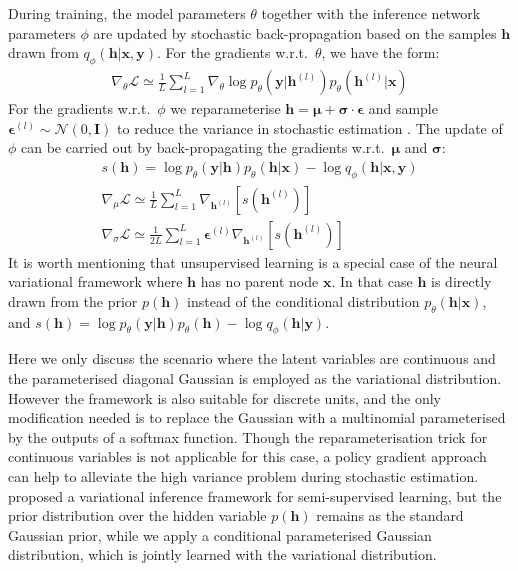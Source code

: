 \documentclass{article}
\newcommand{\tmmathbf}[1]{\ensuremath{\boldsymbol{#1}}}
\begin{document}
During training, the model parameters $\theta$ together with the inference network parameters $\phi$ are updated by stochastic back-propagation based on the samples $\tmmathbf{h}$ drawn from $q_{\phi} ( \tmmathbf{h} | \tmmathbf{\tmmathbf{x}}, \tmmathbf{y})$. 
For the gradients w.r.t.\ $\theta$, we have the form:
\begin{eqnarray}
  & \nabla_{\theta}  \mathcal{L} \simeq \frac{1}{L}  \sum_{l = 1}^L
  \nabla_{\theta} \log p_{\theta} ( \tmmathbf{y} | \tmmathbf{h}^{(l)})
  p_{\theta} ( \tmmathbf{h}^{(l)} | \tmmathbf{\tmmathbf{x}}) & 
\end{eqnarray}
For the gradients w.r.t.\ $\phi$ we reparameterise $\tmmathbf{h} =\tmmathbf{\mu} + \tmmathbf{\sigma} \cdot \tmmathbf{\epsilon}$ and sample $\tmmathbf{\epsilon}^{(l)} \sim \mathcal{N} (0, \tmmathbf{I})$ to reduce the variance in stochastic estimation  {\citep{rezende2014stochastic,kingma2013auto}}. 
The update of $\phi$ can be carried out by back-propagating the gradients w.r.t.\ $\tmmathbf{\mu}$ and $\tmmathbf{\sigma}$:
\begin{eqnarray}
　\nonumber　&　 s(\tmmathbf{h})  = \log p_{\theta} ( \tmmathbf{y} | \tmmathbf{h})
  p_{\theta} ( \tmmathbf{h}| \tmmathbf{\tmmathbf{x}}) 
   - \log q_{\phi} (  \tmmathbf{h} | \tmmathbf{\tmmathbf{x}}, \tmmathbf{y}) &\\
   &\nabla_{\mu}  \mathcal{L}  \simeq \frac{1}{L}  \sum_{l = 1}^L
  \nabla_{\tmmathbf{h}^{(l)}}  [ s(\tmmathbf{h}^{(l)}) ]& \\
  & \nabla_{\sigma}  \mathcal{L} \simeq \frac{1}{2 L}  \sum_{l = 1}^L
  \tmmathbf{\epsilon}^{(l)} \nabla_{\tmmathbf{h}^{(l)}}  [s(\tmmathbf{h}^{(l)})] & 
\end{eqnarray}
It is worth mentioning that unsupervised learning is a special case of the neural variational framework where $\tmmathbf{h}$ has no parent node $\tmmathbf{x}$. In that case $\tmmathbf{h}$ is directly drawn from the prior $p(\tmmathbf{h})$ instead of the conditional distribution $p_{\theta}(\tmmathbf{h}|\tmmathbf{x})$, and $s(\tmmathbf{h})  = \log p_{\theta} ( \tmmathbf{y} | \tmmathbf{h}) p_{\theta} (\tmmathbf{h})-\log q_{\phi} ( \tmmathbf{h}|\tmmathbf{y})$.

Here we only discuss the scenario where the latent variables are continuous and the parameterised diagonal Gaussian is employed as the variational distribution. 
However the framework is also suitable for discrete units, and the only modification needed is to replace the Gaussian with a multinomial parameterised by the outputs of a softmax function. 
Though the reparameterisation trick for continuous variables is not applicable for this case, a policy gradient approach {\citep{mnih2014neural}} can help to alleviate the high variance problem during stochastic estimation. \cite{kingma2014semi} proposed a variational inference framework for semi-supervised learning, but the prior distribution over the hidden variable $p(\tmmathbf{h})$ remains as the standard Gaussian prior, while we  apply a conditional parameterised Gaussian distribution, which is jointly learned with the variational distribution.
\end{document}
